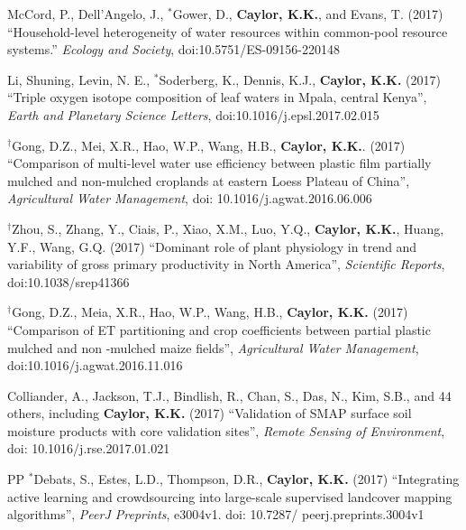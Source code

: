 \documentclass[10pt]{report}
\begin{document}
\begin{etaremune}
\item McCord, P., Dell'Angelo, J., $^{*}$Gower, D.,  \textbf{Caylor, K.K.}, and Evans, T. (2017) ``Household-level heterogeneity of water resources within common-pool resource systems.'' {\em Ecology and Society}, doi:10.5751/ES-09156-220148

\item Li, Shuning, Levin, N. E.,  $^{*}$Soderberg, K., Dennis, K.J., \textbf{Caylor, K.K.} (2017) ``Triple oxygen isotope composition of leaf waters in Mpala, central Kenya'', {\em Earth and Planetary Science Letters}, doi:10.1016/j.epsl.2017.02.015

\item $^{\dagger}$Gong, D.Z., Mei, X.R., Hao, W.P., Wang, H.B., \textbf{Caylor, K.K.}. (2017) ``Comparison of multi-level water use efficiency between plastic film partially mulched and non-mulched croplands at eastern Loess Plateau of China'', {\em Agricultural Water Management}, doi: 10.1016/j.agwat.2016.06.006

\item $^{\dagger}$Zhou, S., Zhang, Y., Ciais, P., Xiao, X.M., Luo, Y.Q., \textbf{Caylor, K.K.}, Huang, Y.F., Wang, G.Q. (2017) ``Dominant role of plant physiology in trend and variability of gross primary productivity in North America'', {\em Scientific Reports}, doi:10.1038/srep41366

\item $^{\dagger}$Gong, D.Z., Meia, X.R., Hao, W.P., Wang, H.B., \textbf{Caylor, K.K.} (2017) ``Comparison of ET partitioning and crop coefficients between partial plastic mulched and non -mulched maize fields'', {\em Agricultural Water Management}, doi:10.1016/j.agwat.2016.11.016

\item Colliander, A., Jackson, T.J., Bindlish, R., Chan, S., Das, N., Kim, S.B., and  44 others, including \textbf{Caylor, K.K.} (2017) ``Validation of SMAP surface soil moisture products with core validation sites'', {\em Remote Sensing of Environment}, doi: 10.1016/j.rse.2017.01.021

\item [PP] $^{*}$Debats, S., Estes, L.D., Thompson, D.R., \textbf{Caylor, K.K.} (2017) ``Integrating active learning and crowdsourcing into large-scale supervised landcover mapping algorithms'', {\em PeerJ Preprints}, e3004v1. doi: 10.7287/ peerj.preprints.3004v1


\end{etaremune}
\end{document}
